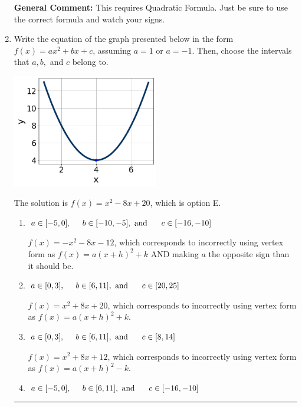 \documentclass{extbook}[14pt]
\newcommand{\litem}[1]{\item #1

\rule{\textwidth}{0.4pt}}
\begin{document}
\begin{enumerate}
{\textbf{General Comment:} This requires Quadratic Formula. Just be sure to use the correct formula and watch your signs.
}
\litem{
Write the equation of the graph presented below in the form $f(x)=ax^2+bx+c$, assuming  $a=1$ or $a=-1$. Then, choose the intervals that $a, b,$ and $c$ belong to.

\begin{center}
    \includegraphics[width=0.5\textwidth]{../Figures/quadraticGraphToEquationA.png}
\end{center}



The solution is \( f(x) = x^{2} -8 x + 20 \), which is option E.\begin{enumerate}[label=\Alph*.]
\item \( a \in [-5, 0], \hspace*{5mm} b \in [-10, -5], \text{ and } \hspace*{5mm} c \in [-16, -10] \)

$f(x)=-x^{2} -8 x -12$, which corresponds to incorrectly using vertex form as $f(x) = a(x+h)^2+k$ AND making $a$ the opposite sign than it should be.
\item \( a \in [0, 3], \hspace*{5mm} b \in [6, 11], \text{ and } \hspace*{5mm} c \in [20, 25] \)

$f(x)=x^{2} +8 x + 20$, which corresponds to incorrectly using vertex form as $f(x) = a(x+h)^2+k$.
\item \( a \in [0, 3], \hspace*{5mm} b \in [6, 11], \text{ and } \hspace*{5mm} c \in [8, 14] \)

$f(x)=x^{2} +8 x + 12$, which corresponds to incorrectly using vertex form as $f(x) = a(x+h)^2 - k$.
\item \( a \in [-5, 0], \hspace*{5mm} b \in [6, 11], \text{ and } \hspace*{5mm} c \in [-16, -10] \)


\end{enumerate}}
\end{enumerate}
\end{document}
